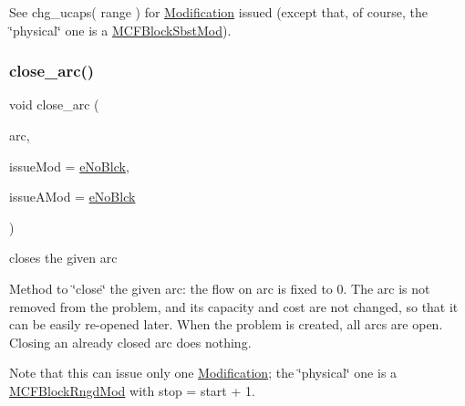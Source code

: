 See chg\+\_\+ucaps( range ) for \mbox{\hyperlink{class_s_m_spp__di__unipi__it_1_1_modification}{Modification}} issued (except that, of course, the \char`\"{}physical\char`\"{} one is a \mbox{\hyperlink{class_s_m_spp__di__unipi__it_1_1_m_c_f_block_sbst_mod}{M\+C\+F\+Block\+Sbst\+Mod}}). \mbox{\label{class_s_m_spp__di__unipi__it_1_1_m_c_f_block_a571800e44805781e142094cdcf1f7e21}} 
\subsubsection{\texorpdfstring{close\+\_\+arc()}{close\_arc()}}
{\footnotesize\ttfamily void close\+\_\+arc (\begin{DoxyParamCaption}\item[{\mbox{\hyperlink{class_s_m_spp__di__unipi__it_1_1_m_c_f_block_aee6156e2ce80720d57a082d80f39d8cc}{c\+\_\+\+Index}}}]{arc,  }\item[{\mbox{\hyperlink{group___modification___t_y_p_e_s_ga544246d8c462e9a2d817c2c30797968f}{c\+\_\+\+Mod\+Param}}}]{issue\+Mod = {\ttfamily \mbox{\hyperlink{group___modification___t_y_p_e_s_gga48fddcdd03a03f49b7e389ca1ed938d4ada69e89c5f46e563d8a13cfa6830c136}{e\+No\+Blck}}},  }\item[{\mbox{\hyperlink{group___modification___t_y_p_e_s_ga544246d8c462e9a2d817c2c30797968f}{c\+\_\+\+Mod\+Param}}}]{issue\+A\+Mod = {\ttfamily \mbox{\hyperlink{group___modification___t_y_p_e_s_gga48fddcdd03a03f49b7e389ca1ed938d4ada69e89c5f46e563d8a13cfa6830c136}{e\+No\+Blck}}} }\end{DoxyParamCaption})}



closes the given arc 

Method to \char`\"{}close\char`\"{} the given arc\+: the flow on arc is fixed to 0. The arc is not removed from the problem, and its capacity and cost are not changed, so that it can be easily re-\/opened later. When the problem is created, all arcs are open. Closing an already closed arc does nothing.

Note that this can issue only one \mbox{\hyperlink{class_s_m_spp__di__unipi__it_1_1_modification}{Modification}}; the \char`\"{}physical\char`\"{} one is a \mbox{\hyperlink{class_s_m_spp__di__unipi__it_1_1_m_c_f_block_rngd_mod}{M\+C\+F\+Block\+Rngd\+Mod}} with stop = start + 1. \mbox{\label{class_s_m_spp__di__unipi__it_1_1_m_c_f_block_a002a805c2a25efab3dd3b3c5c2659050}} 
